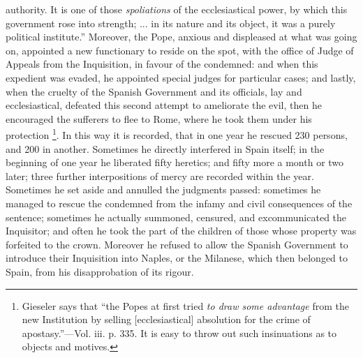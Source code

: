 authority. It is one of those \emph{spoliations} of the
ecclesiastical power, by which this government rose into
strength; ... in its nature and its object, it was a
purely political institute.'' Moreover, the Pope,
anxious and displeased at what was going on, appointed a
new functionary to reside on the spot, with the office of
Judge of Appeals from the Inquisition, in favour of the
condemned: and when this expedient was evaded, he
appointed special judges for particular cases; and
lastly, when the cruelty of the Spanish Government and
its officials, lay and ecclesiastical, defeated this
second attempt to ameliorate the evil, then he encouraged
the sufferers to flee to Rome, where he took them under
his protection \footnote{Gieseler says that ``the
Popes at first tried \emph{to draw some advantage} from
the new Institution by selling [ecclesiastical]
absolution for the crime of apostasy.''—Vol.
iii. p. 335. It is easy to throw out such insinuations as
to objects and motives.}. In this way it is recorded, that in one year he
rescued 230 persons, and 200 in another. Sometimes he
directly interfered in Spain itself; in the beginning of
one year he liberated fifty heretics; and fifty more a
month or two later; three further interpositions of mercy
are recorded within the year. Sometimes he set aside and
annulled the judgments passed: sometimes he managed to
rescue the condemned from the infamy and civil
consequences of the sentence; sometimes he actually
summoned, censured, and excommunicated the Inquisitor;
and often he took the part of the children of those whose
property was forfeited to the crown. Moreover he refused
to allow the Spanish Government to introduce their
Inquisition into Naples, or the Milanese, which then
belonged to Spain, from his disapprobation of its rigour.

